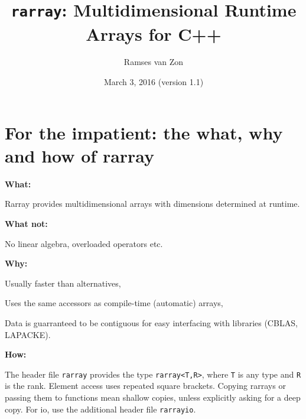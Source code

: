 \documentclass[11pt,twoside]{article}
\newcommand{\cxx}{C{++}}
\begin{document}
\setlength{\parskip}{1mm}

\title{\texttt{rarray}: Multidimensional Runtime Arrays for \cxx}

\author{Ramses van Zon%
\vspace{-8pt}} 

\date{March 3, 2016 (version 1.1)\vspace{-7mm}}

\maketitle

\section{For the impatient: the what, why and how of rarray}

\noindent\textbf{What:}

Rarray provides multidimensional arrays with dimensions determined at runtime. 

\noindent\textbf{What not:} 

No linear algebra, overloaded operators etc.

\noindent\textbf{Why:} 

Usually faster than alternatives,

Uses the same accessors as compile-time (automatic) arrays,

Data is guarranteed to be contiguous for easy interfacing with
libraries (CBLAS, LAPACKE).

\noindent\textbf{How:}

The header file \texttt{rarray} provides the type \texttt{rarray<T,R>}, where \texttt{T} is any type and {\tt R} is the rank. Element access uses repeated square brackets. Copying rarrays or passing them to functions mean shallow copies, unless explicitly asking for a deep copy. For io, use the additional header file \texttt{rarrayio}.

\
\end{document}
